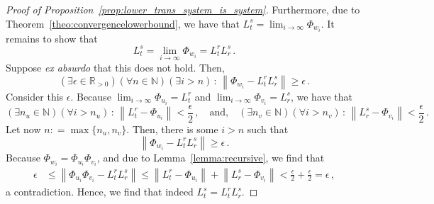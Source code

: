 \documentclass[10pt]{paper}
\theoremstyle{definition}
\newcommand{\nats}{\mathbb{N}}
\newcommand{\reals}{\mathbb{R}}
\newcommand{\realspos}{\reals_{>0}}
\newcommand{\norm}[1]{\left\lVert #1 \right\rVert}
\newcommand{\coloneqq}{:\!=}
\begin{document}
\begin{proof}[Proof of Proposition~\ref{prop:lower_trans_system_is_system}]
Furthermore, due to Theorem~\ref{theo:convergencelowerbound}, we have that $L_t^s = \lim_{i\to\infty}\Phi_{w_i}$.
It remains to show that
\begin{equation*}
L_t^s = \lim_{i\to\infty}\Phi_{w_i} = L_t^rL_r^s\,.
\end{equation*}
Suppose \emph{ex absurdo} that this does not hold. Then,
\begin{equation*}
(\exists \epsilon\in\realspos)(\forall n\in\nats)(\exists i>n)\,:\,\norm{\Phi_{w_i} - L_t^rL_r^s} \geq \epsilon\,.
\end{equation*}
Consider this $\epsilon$. Because $\lim_{i\to\infty}\Phi_{u_i}=L_t^r$ and $\lim_{i\to\infty}\Phi_{v_i}=L_r^s$, we have that
\begin{equation*}
(\exists n_u\in\nats)(\forall i>n_u)\,:\,\norm{L_t^r - \Phi_{u_i}}<\frac{\epsilon}{2}\,,\quad\text{and,}\quad(\exists n_v\in\nats)(\forall i>n_v)\,:\,\norm{L_r^s - \Phi_{v_i}}<\frac{\epsilon}{2}\,.
\end{equation*}
Let now $n\coloneqq \max\{n_u,n_v\}$. Then, there is some $i>n$ such that
\begin{equation*}
\norm{\Phi_{w_i} - L_t^rL_r^s} \geq \epsilon\,.
\end{equation*}
Because $\Phi_{w_i}=\Phi_{u_i}\Phi_{v_i}$, and due to Lemma~\ref{lemma:recursive}, we find that
\begin{align*}
\epsilon &\leq \norm{\Phi_{u_i}\Phi_{v_i} - L_t^rL_r^s} \leq \norm{L_t^r - \Phi_{u_i}} + \norm{L_r^s - \Phi_{v_i}} < \frac{\epsilon}{2} + \frac{\epsilon}{2} = \epsilon\,,
\end{align*}
a contradiction. Hence, we find that indeed $L_t^s=L_t^rL_r^s$.
\end{proof}
\end{document}
